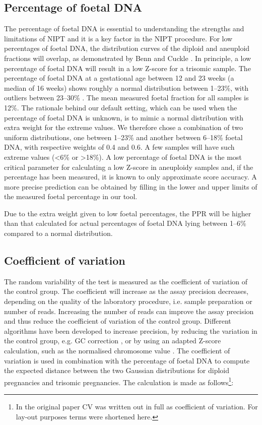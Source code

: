 \subsection{Percentage of foetal DNA}
The percentage of foetal DNA is essential to understanding the strengths and limitations of NIPT \cite{Fairbrother_2013,Benn_2014} and it is a key factor in the NIPT procedure. 
For low percentages of foetal DNA, the distribution curves of the diploid and aneuploid fractions will overlap, as demonstrated by Benn and Cuckle \cite{Benn_2014}. 
In principle, a low percentage of foetal DNA will result in a low Z-score for a trisomic sample. 
The percentage of foetal DNA at a gestational age between 12 and 23 weeks (a median of 16 weeks) shows roughly a normal distribution between 1–23\%, with outliers between 23–30\% \cite{Ashoor_2012a,Pergament_2014}. 
The mean measured foetal fraction for all samples is 12\%. 
The rationale behind our default setting, which can be used when the percentage of foetal DNA is unknown, is to mimic a normal distribution with extra weight for the extreme values. 
We therefore chose a combination of two uniform distributions, one between 1–23\% and another between 6–18\% foetal DNA, with respective weights of 0.4 and 0.6. 
A few samples will have such extreme values (\textless6\% or \textgreater18\%). 
A low percentage of foetal DNA is the most critical parameter for calculating a low Z-score in aneuploidy samples and, if the percentage has been measured, it is known to only approximate score accuracy. 
A more precise prediction can be obtained by filling in the lower and upper limits of the measured foetal percentage in our tool.

Due to the extra weight given to low foetal percentages, the PPR will be higher than that calculated for actual percentages of foetal DNA lying between 1–6\% compared to a normal distribution.

\subsection{Coefficient of variation}
The random variability of the test is measured as the coefficient of variation of the control group. 
The coefficient will increase as the assay precision decreases, depending on the quality of the laboratory procedure, i.e. sample preparation or number of reads. 
Increasing the number of reads can improve the assay precision and thus reduce the coefficient of variation of the control group. 
Different algorithms have been developed to increase precision, by reducing the variation in the control group, e.g. GC correction \cite{Fan_2010}, or by using an adapted Z-score calculation, such as the normalised chromosome value \cite{Lau_2012,Sehnert_2011}. 
The coefficient of variation is used in combination with the percentage of foetal DNA to compute the expected distance between the two Gaussian distributions for diploid pregnancies and trisomic pregnancies. 
The calculation is made as follows\footnote{In the original paper CV was written out in full as coefficient of variation. For lay-out purposes terms were shortened here.}:

